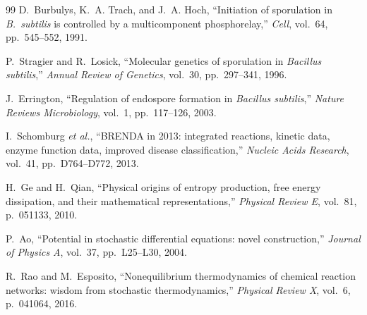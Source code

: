 \documentclass[11pt,a4paper]{article}
\begin{document}
\begin{thebibliography}{99}
D.~Burbulys, K.~A. Trach, and J.~A. Hoch,
``Initiation of sporulation in \textit{B.~subtilis} is controlled by a
multicomponent phosphorelay,''
\textit{Cell}, vol.~64, pp.~545--552, 1991.

P.~Stragier and R.~Losick,
``Molecular genetics of sporulation in \textit{Bacillus subtilis},''
\textit{Annual Review of Genetics}, vol.~30, pp.~297--341, 1996.

J.~Errington,
``Regulation of endospore formation in \textit{Bacillus subtilis},''
\textit{Nature Reviews Microbiology}, vol.~1, pp.~117--126, 2003.

I.~Schomburg \textit{et al.},
``{BRENDA} in 2013: integrated reactions, kinetic data, enzyme function
data, improved disease classification,''
\textit{Nucleic Acids Research}, vol.~41, pp.~D764--D772, 2013.

H.~Ge and H.~Qian,
``Physical origins of entropy production, free energy dissipation, and
their mathematical representations,''
\textit{Physical Review E}, vol.~81, p.~051133, 2010.

P.~Ao,
``Potential in stochastic differential equations: novel construction,''
\textit{Journal of Physics A}, vol.~37, pp.~L25--L30, 2004.

R.~Rao and M.~Esposito,
``Nonequilibrium thermodynamics of chemical reaction networks: wisdom
from stochastic thermodynamics,''
\textit{Physical Review X}, vol.~6, p.~041064, 2016.

\end{thebibliography}
\end{document}
